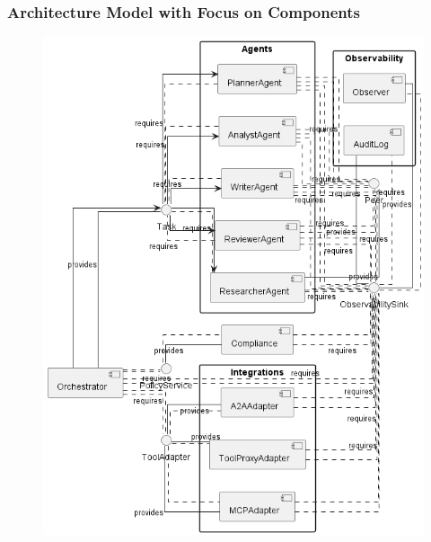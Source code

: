 \subsubsection*{Architecture Model with Focus on Components }
\begin{figure}[htbp]
  \centering
  \includegraphics[width=\linewidth]{ressources/MAS/diagrams/MAS_architecture_complete_appendix.png}
  \caption{}
  \label{fig:app-mas-arch-mod}
\end{figure}

\clearpage
